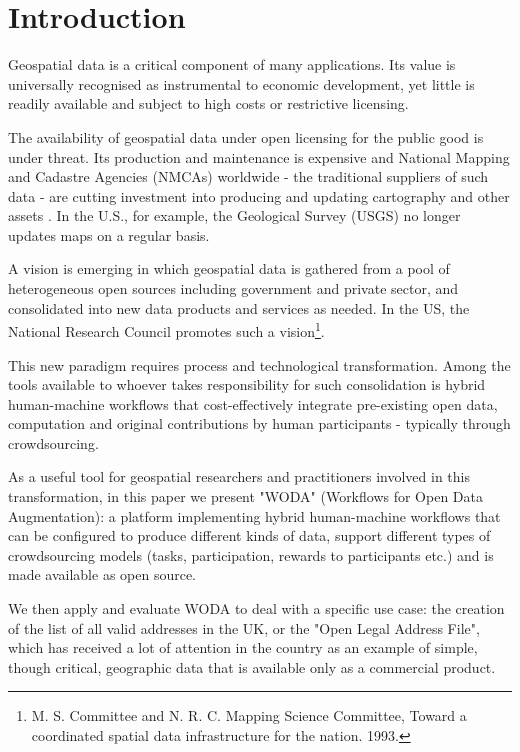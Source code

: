 \section{Introduction}

Geospatial data is a critical component of many applications. Its value is universally recognised as instrumental to economic development, yet little is readily available and subject to high costs or restrictive licensing. 

The availability of geospatial data under open licensing for the public good is under threat. Its production and maintenance is expensive and National Mapping and Cadastre Agencies (NMCAs) worldwide - the traditional suppliers of such data - are cutting investment into producing and updating cartography and other assets \cite{ESTES:1994vz}. In the U.S., for example, the Geological Survey (USGS) no longer updates maps on a regular basis. 

A vision is emerging in which geospatial data is gathered from a pool of heterogeneous open sources including government and private sector, and consolidated into new data products and services as needed. In the US, the National Research Council promotes such a vision\footnote{M. S. Committee and N. R. C. Mapping Science Committee, Toward a coordinated spatial data infrastructure for the nation. 1993.}.

This new paradigm requires process and technological transformation. Among the tools available to whoever takes responsibility for such consolidation is hybrid human-machine workflows that cost-effectively integrate pre-existing open data, computation and original contributions by human participants - typically through crowdsourcing. 

As a useful tool for geospatial researchers and practitioners involved in this transformation, in this paper we present "WODA" (Workflows for Open Data Augmentation): a platform implementing hybrid human-machine workflows that can be configured to produce different kinds of data, support different types of crowdsourcing models (tasks, participation, rewards to participants etc.) and is made available as open source. 

We then apply and evaluate WODA to deal with a specific use case: the creation of the list of all valid addresses in the UK, or the "Open Legal Address File", which has received a lot of attention in the country as an example of simple, though critical, geographic data that is available only as a commercial product.
